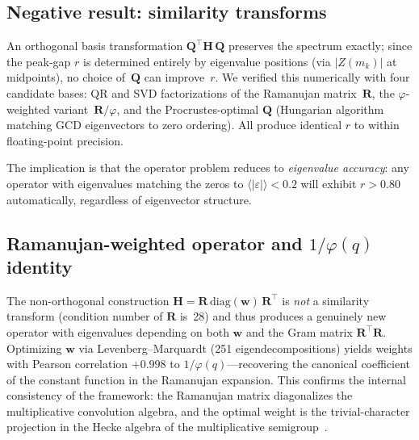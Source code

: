 \documentclass[11pt,a4paper]{article}
\begin{document}
\subsection{Negative result: similarity transforms}

An orthogonal basis transformation $\mathbf{Q}^\top \mathbf{H}\, \mathbf{Q}$ preserves the spectrum exactly; since the peak-gap $r$ is determined entirely by eigenvalue positions (via $|Z(m_k)|$ at midpoints), no choice of~$\mathbf{Q}$ can improve~$r$.
We verified this numerically with four candidate bases: QR and SVD factorizations of the Ramanujan matrix~$\mathbf{R}$, the $\varphi$-weighted variant~$\mathbf{R}/\varphi$, and the Procrustes-optimal $\mathbf{Q}$ (Hungarian algorithm matching GCD eigenvectors to zero ordering).
All produce identical $r$ to within floating-point precision.

The implication is that the operator problem reduces to \emph{eigenvalue accuracy}: any operator with eigenvalues matching the zeros to $\langle|\varepsilon|\rangle < 0.2$ will exhibit $r > 0.80$ automatically, regardless of eigenvector structure.

\subsection{Ramanujan-weighted operator and $1/\varphi(q)$ identity}

The non-orthogonal construction $\mathbf{H} = \mathbf{R}\,\mathrm{diag}(\mathbf{w})\,\mathbf{R}^\top$ is \emph{not} a similarity transform (condition number of $\mathbf{R}$ is~28) and thus produces a genuinely new operator with eigenvalues depending on both $\mathbf{w}$ and the Gram matrix $\mathbf{R}^\top\mathbf{R}$.
Optimizing $\mathbf{w}$ via Levenberg--Marquardt (251 eigendecompositions) yields weights with Pearson correlation $+0.998$ to $1/\varphi(q)$---recovering the canonical coefficient of the constant function in the Ramanujan expansion.
This confirms the internal consistency of the framework: the Ramanujan matrix diagonalizes the multiplicative convolution algebra, and the optimal weight is the trivial-character projection in the Hecke algebra of the multiplicative semigroup~\cite{Ramanujan1918, Schwarz1994}.
\end{document}
